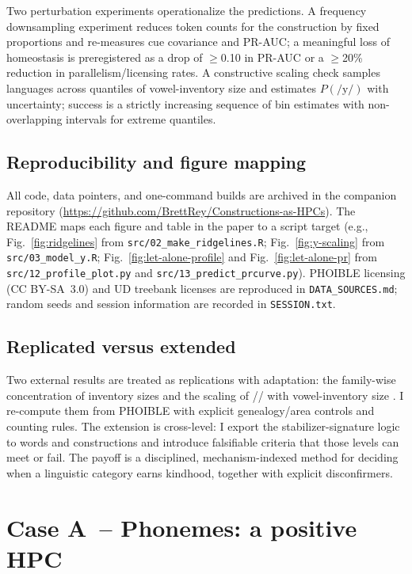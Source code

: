 \documentclass[12pt]{article}
\begin{document}
Two perturbation experiments operationalize the predictions. A frequency downsampling experiment reduces token counts for the construction by fixed proportions and re-measures cue covariance and PR-AUC; a meaningful loss of homeostasis is preregistered as a drop of $\ge$0.10 in PR-AUC or a $\ge$20\% reduction in parallelism/licensing rates. A constructive scaling check samples languages across quantiles of vowel-inventory size and estimates $P(\text{/y/})$ with uncertainty; success is a strictly increasing sequence of bin estimates with non-overlapping intervals for extreme quantiles.

\subsection*{Reproducibility and figure mapping}

All code, data pointers, and one-command builds are archived in the companion repository (\url{https://github.com/BrettRey/Constructions-as-HPCs}). The README maps each figure and table in the paper to a script target (e.g., Fig.~\ref{fig:ridgelines} from \texttt{src/02\_make\_ridgelines.R}; Fig.~\ref{fig:y-scaling} from \texttt{src/03\_model\_y.R}; Fig.~\ref{fig:let-alone-profile} and Fig.~\ref{fig:let-alone-pr} from \texttt{src/12\_profile\_plot.py} and \texttt{src/13\_predict\_prcurve.py}). PHOIBLE licensing (CC BY-SA~3.0) and UD treebank licenses are reproduced in \texttt{DATA\_SOURCES.md}; random seeds and session information are recorded in \texttt{SESSION.txt}.

\subsection*{Replicated versus extended}

Two external results are treated as replications with adaptation: the family-wise concentration of inventory sizes and the scaling of // with vowel-inventory size \citep[Fig.\,1; Fig.\,2]{Ekstrom2025PhonemeTool}. I re-compute them from PHOIBLE with explicit genealogy/area controls and counting rules. The extension is cross-level: I export the stabilizer-signature logic to words and constructions and introduce falsifiable criteria that those levels can meet or fail. The payoff is a disciplined, mechanism-indexed method for deciding when a linguistic category earns kindhood, together with explicit disconfirmers.



\section{Case A~-- Phonemes: a positive HPC}\label{sec:case-phoneme}
\end{document}
